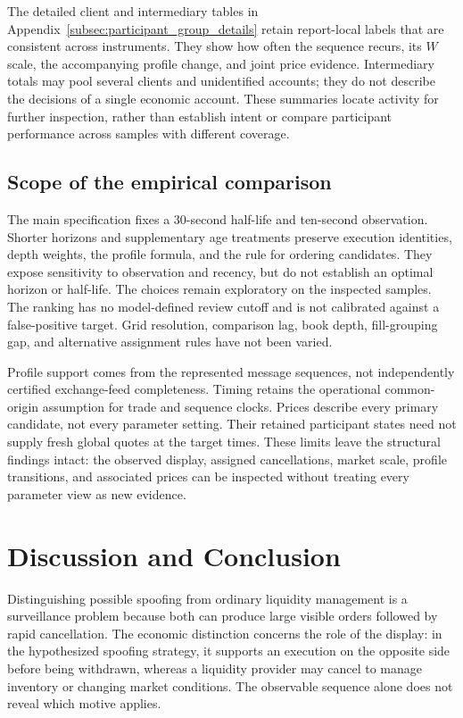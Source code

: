 \documentclass[11pt]{article}
\begin{document}
The detailed client and intermediary tables in Appendix~\ref{subsec:participant_group_details} retain report-local labels that are consistent across instruments. They show how often the sequence recurs, its $W$ scale, the accompanying profile change, and joint price evidence. Intermediary totals may pool several clients and unidentified accounts; they do not describe the decisions of a single economic account. These summaries locate activity for further inspection, rather than establish intent or compare participant performance across samples with different coverage.

\FloatBarrier
\subsection{Scope of the empirical comparison}
\label{subsec:withdrawal_sensitivity_results}

The main specification fixes a 30-second half-life and ten-second observation. Shorter horizons and supplementary age treatments preserve execution identities, depth weights, the profile formula, and the rule for ordering candidates. They expose sensitivity to observation and recency, but do not establish an optimal horizon or half-life. The choices remain exploratory on the inspected samples. The ranking has no model-defined review cutoff and is not calibrated against a false-positive target. Grid resolution, comparison lag, book depth, fill-grouping gap, and alternative assignment rules have not been varied.

Profile support comes from the represented message sequences, not independently certified exchange-feed completeness. Timing retains the operational common-origin assumption for trade and sequence clocks. Prices describe every primary candidate, not every parameter setting. Their retained participant states need not supply fresh global quotes at the target times. These limits leave the structural findings intact: the observed display, assigned cancellations, market scale, profile transitions, and associated prices can be inspected without treating every parameter view as new evidence.

\section{Discussion and Conclusion}
\label{sec:discussion_conclusion}

Distinguishing possible spoofing from ordinary liquidity management is a surveillance problem because both can produce large visible orders followed by rapid cancellation. The economic distinction concerns the role of the display: in the hypothesized spoofing strategy, it supports an execution on the opposite side before being withdrawn, whereas a liquidity provider may cancel to manage inventory or changing market conditions. The observable sequence alone does not reveal which motive applies.
\end{document}
